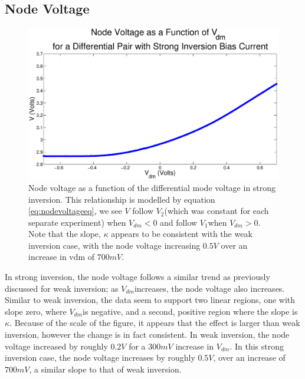 \documentclass{article}
\newcommand{\Vtwo}{{$V_{2}$}}
\newcommand{\Vone}{{$V_{1}$}}
\newcommand{\Vdm}{{$V_{dm}$}}
\begin{document}

\subsection*{Node Voltage}
\begin{figure}[H]
\centering
\includegraphics[width=\linewidth]{./Figures/NodeVoltageStrongInversion.eps}
\caption{Node voltage as a function of the differential mode voltage in strong inversion. This relationship is modelled by equation \ref{eq:nodevoltageeq}, we see $V$ follow \Vtwo (which was constant for each separate experiment) when $V_{dm} < 0$ and follow \Vone when $V_{dm} > 0$. Note that the slope, $\kappa$ appears to be consistent with the weak inversion case, with the node voltage increasing $0.5V$ over an increase in vdm of $700mV$. }
\label{fig:nodevoltageSI}
\end{figure}

In strong inversion, the node voltage follows a similar trend as previously discussed for weak inversion; as \Vdm increases, the node voltage also increases. Similar to weak inversion, the data seem to support two linear regions, one with slope zero, where \Vdm is negative, and a second, positive region where the slope is $\kappa$. Because of the scale of the figure, it appears that the effect is larger than weak inversion, however the change is in fact consistent. In weak inversion, the node voltage increased by roughly $0.2V$ for a $300mV$ increase in \Vdm. In this strong inversion case, the node voltage increases by roughly $0.5V$, over an increase of $700mV$, a similar slope to that of weak inversion. 
\end{document}
